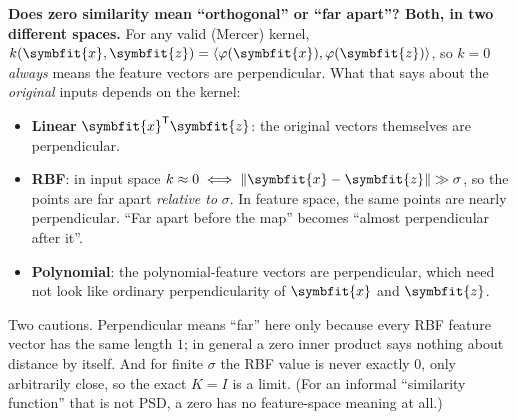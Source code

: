 \documentclass[11pt]{article}
\newcommand{\bm}[1]{\symbfit{#1}}
\newcommand{\vx}{\bm{x}}
\newcommand{\T}{^{\mathsf T}}
\newcommand{\norm}[1]{\left\lVert #1\right\rVert}
\begin{document}
\begin{intuition}
\textbf{Does zero similarity mean ``orthogonal'' or ``far apart''? Both, in two different spaces.} For any valid (Mercer)
kernel, $k(\vx,\bm z)=\langle\varphi(\vx),\varphi(\bm z)\rangle$, so $k=0$ \emph{always} means the feature vectors are perpendicular. What that says about the
\emph{original} inputs depends on the kernel:
\begin{itemize}[nosep]
\item \textbf{Linear} $\vx\T\bm z$: the original vectors themselves are perpendicular.
\item \textbf{RBF}: in input space $k\approx0\iff\norm{\vx-\bm z}\gg\sigma$, so the points are far apart \emph{relative to} $\sigma$. In feature space,
the same points are nearly perpendicular. ``Far apart before the map'' becomes ``almost perpendicular after it''.
\item \textbf{Polynomial}: the polynomial-feature vectors are perpendicular, which need not look like ordinary
perpendicularity of $\vx$ and $\bm z$.
\end{itemize}
Two cautions. Perpendicular means ``far'' here only because every RBF feature vector has the same length $1$; in general a
zero inner product says nothing about distance by itself. And for finite $\sigma$ the RBF value is never exactly $0$, only
arbitrarily close, so the exact $K=I$ is a limit. (For an informal ``similarity function'' that is not PSD, a zero has no
feature-space meaning at all.)
\end{intuition}
\end{document}
